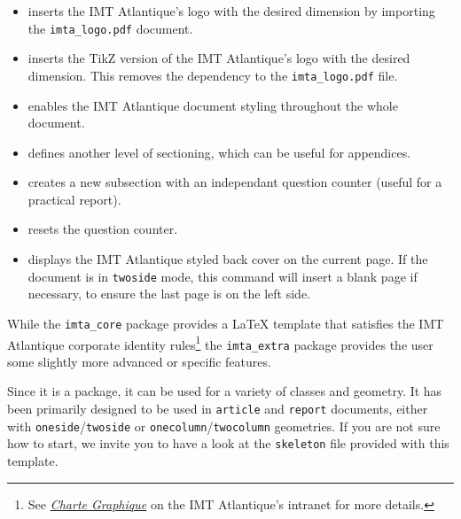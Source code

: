 \documentclass{report}
\begin{document}
\begin{itemize}
    \item {} inserts the IMT Atlantique's logo with the desired dimension by importing the \texttt{imta\_logo.pdf} document.
    
    \item {} inserts the TikZ version of the IMT Atlantique's logo with the desired dimension. 
    This removes the dependency to the \texttt{imta\_logo.pdf} file.
    
    \item {} enables the IMT Atlantique document styling throughout the whole document.
    
    \item {} defines another level of sectioning, which can be useful for appendices.
    
    \item {} creates a new subsection with an independant question counter (useful for a practical report).
    
    \item {} resets the question counter.
    
    \item {} displays the IMT Atlantique styled back cover on the current page. 
    If the document is in \texttt{twoside} mode, this command will insert a blank page if necessary, to ensure the last page is on the left side.
\end{itemize}






While the \texttt{imta\_core} package provides a \LaTeX{} template that satisfies the IMT Atlantique corporate identity rules\footnote{See \textit{\href{https://intranet.imt-atlantique.fr/wp-content/uploads/2017/01/imt_atlantique_chartegraphique.pdf}{Charte Graphique}} on the IMT Atlantique's intranet for more details.} the \texttt{imta\_extra} package provides the user some slightly more advanced or specific features.

Since it is a package, it can be used for a variety of classes and geometry. It has been primarily designed to be used in \texttt{article} and \texttt{report} documents, either with \texttt{oneside}/\texttt{twoside} or \texttt{onecolumn}/\texttt{twocolumn} geometries.
If you are not sure how to start, we invite you to have a look at the \texttt{skeleton} file provided with this template.
\end{document}
